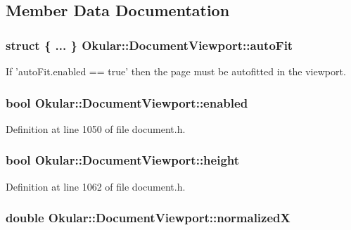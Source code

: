 \subsection{Member Data Documentation}
\hypertarget{classOkular_1_1DocumentViewport_a5acbe494c97c15ae7937003474a78a40}{
\subsubsection[{auto\+Fit}]{\setlength{\rightskip}{0pt plus 5cm}struct \{ ... \}   Okular\+::\+Document\+Viewport\+::auto\+Fit}}\label{classOkular_1_1DocumentViewport_a5acbe494c97c15ae7937003474a78a40}
If 'auto\+Fit.\+enabled == true' then the page must be autofitted in the viewport. \hypertarget{classOkular_1_1DocumentViewport_a6dddb31dbc72d7fb3efe094d840d8692}{
\subsubsection[{enabled}]{\setlength{\rightskip}{0pt plus 5cm}bool Okular\+::\+Document\+Viewport\+::enabled}}\label{classOkular_1_1DocumentViewport_a6dddb31dbc72d7fb3efe094d840d8692}


Definition at line 1050 of file document.\+h.

\hypertarget{classOkular_1_1DocumentViewport_a1deb8db38c11ca9c5239261be374ab8a}{
\subsubsection[{height}]{\setlength{\rightskip}{0pt plus 5cm}bool Okular\+::\+Document\+Viewport\+::height}}\label{classOkular_1_1DocumentViewport_a1deb8db38c11ca9c5239261be374ab8a}


Definition at line 1062 of file document.\+h.

\hypertarget{classOkular_1_1DocumentViewport_a2f749d09360cca2f64af1a893a190e2f}{
\subsubsection[{normalized\+X}]{\setlength{\rightskip}{0pt plus 5cm}double Okular\+::\+Document\+Viewport\+::normalized\+X}}\label{classOkular_1_1DocumentViewport_a2f749d09360cca2f64af1a893a190e2f}


